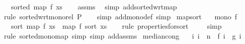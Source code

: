 \begin{isabellebody}
\ \ \ {\isachardoublequoteopen}sorted\ {\isacharparenleft}{\kern0pt}map\ f\ xs{\isacharparenright}{\kern0pt}{\isachardoublequoteclose}\isanewline
%
\isadelimproof
\ \ %
\endisadelimproof
%
\isatagproof
{}\isamarkupfalse%
\ assms\ \isamarkupfalse%
\ {\isacharparenleft}{\kern0pt}simp\ add{\isacharcolon}{\kern0pt}sorted{\isacharunderscore}{\kern0pt}wrt{\isacharunderscore}{\kern0pt}map{\isacharparenright}{\kern0pt}\isanewline
\ \ \isamarkupfalse%
\ {\isacharparenleft}{\kern0pt}rule\ sorted{\isacharunderscore}{\kern0pt}wrt{\isacharunderscore}{\kern0pt}mono{\isacharunderscore}{\kern0pt}rel{\isacharbrackleft}{\kern0pt}\ P{\isacharequal}{\kern0pt}{\isachardoublequoteopen}{\isacharparenleft}{\kern0pt}{\isasymle}{\isacharparenright}{\kern0pt}{\isachardoublequoteclose}{\isacharbrackright}{\kern0pt}{\isacharparenright}{\kern0pt}\isanewline
\ \ \isamarkupfalse%
\ {\isacharparenleft}{\kern0pt}simp\ add{\isacharcolon}{\kern0pt}mono{\isacharunderscore}{\kern0pt}def{\isacharcomma}{\kern0pt}\ simp{\isacharparenright}{\kern0pt}%
\endisatagproof
{\isafoldproof}%
%
\isadelimproof
\isanewline
%
\endisadelimproof
\isanewline
{}\isamarkupfalse%
\ map{\isacharunderscore}{\kern0pt}sort{\isacharcolon}{\kern0pt}\isanewline
\ \ \ {\isachardoublequoteopen}mono\ f{\isachardoublequoteclose}\isanewline
\ \ \ {\isachardoublequoteopen}sort\ {\isacharparenleft}{\kern0pt}map\ f\ xs{\isacharparenright}{\kern0pt}\ {\isacharequal}{\kern0pt}\ map\ f\ {\isacharparenleft}{\kern0pt}sort\ xs{\isacharparenright}{\kern0pt}{\isachardoublequoteclose}\isanewline
%
\isadelimproof
\ \ %
\endisadelimproof
%
\isatagproof
{}\isamarkupfalse%
\ {\isacharparenleft}{\kern0pt}rule\ properties{\isacharunderscore}{\kern0pt}for{\isacharunderscore}{\kern0pt}sort{\isacharparenright}{\kern0pt}\isanewline
\ \ \ \isamarkupfalse%
\ simp\isanewline
\ \ \isamarkupfalse%
\ {\isacharparenleft}{\kern0pt}rule\ sorted{\isacharunderscore}{\kern0pt}mono{\isacharunderscore}{\kern0pt}map{\isacharcomma}{\kern0pt}\ simp{\isacharcomma}{\kern0pt}\ simp\ add{\isacharcolon}{\kern0pt}assms{\isacharparenright}{\kern0pt}%
\endisatagproof
{\isafoldproof}%
%
\isadelimproof
\isanewline
%
\endisadelimproof
\isanewline
{}\isamarkupfalse%
\ median{\isacharunderscore}{\kern0pt}cong{\isacharcolon}{\kern0pt}\isanewline
\ \ \ {\isachardoublequoteopen}{\isasymAnd}i{\isachardot}{\kern0pt}\ i\ {\isacharless}{\kern0pt}\ n\ {\isasymLongrightarrow}\ f\ i\ {\isacharequal}{\kern0pt}\ g\ i{\isachardoublequoteclose}\isanewline

\end{isabellebody}
